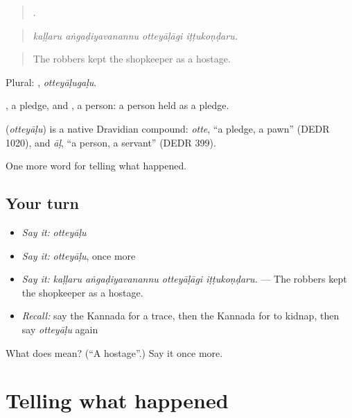 \begin{quote}
   .
\end{quote}

\begin{quote}
\emph{kaḷḷaru aṅgaḍiyavanannu otteyāḷāgi iṭṭukoṇḍaru.}
\end{quote}

\begin{quote}
The robbers kept the shopkeeper as a hostage.
\end{quote}

Plural: , \emph{otteyāḷugaḷu}.

, a pledge, and , a person: a person held as a pledge.

\begin{cousinweb}
\textbf{} (\emph{otteyāḷu}) is a native Dravidian compound: \emph{otte}, \textquotedblleft{}a pledge, a pawn\textquotedblright{} (DEDR 1020), and \emph{āḷ}, \textquotedblleft{}a person, a servant\textquotedblright{} (DEDR 399).
\end{cousinweb}

\begin{grammarlens}[title={What you've built}]
One more word for telling what happened.
\end{grammarlens}

\subsection*{Your turn}
\begin{itemize}
\raggedright
  \item \emph{Say it:} \emph{otteyāḷu}
  \item \emph{Say it:} \emph{otteyāḷu}, once more
  \item \emph{Say it:} \emph{kaḷḷaru aṅgaḍiyavanannu otteyāḷāgi iṭṭukoṇḍaru.} — The robbers kept the shopkeeper as a hostage.
  \item \emph{Recall:} say the Kannada for a trace, then the Kannada for to kidnap, then say \emph{otteyāḷu} again
\end{itemize}

\begin{tcolorbox}[breakable,colback=teal!4,colframe=teal!35!black,title={Before you move on}]
What does  mean? (\textquotedblleft{}A hostage\textquotedblright{}.) Say it once more.
\end{tcolorbox}
\section[(dialogue)]{Telling what happened}


